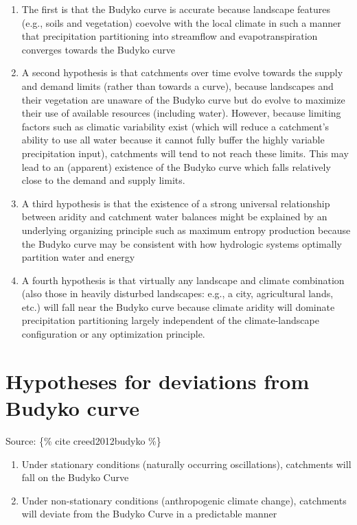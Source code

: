 \documentclass[
  letterpaper,
  DIV=11,
  numbers=noendperiod]{scrreprt}
\providecommand{\tightlist}{%
  \setlength{\itemsep}{0pt}\setlength{\parskip}{0pt}}\usepackage{longtable,booktabs,array}
\begin{document}
\begin{enumerate}
\def\labelenumi{\arabic{enumi}.}
\tightlist
\item
  The first is that the Budyko curve is accurate because landscape
  features (e.g., soils and vegetation) coevolve with the local climate
  in such a manner that precipitation partitioning into streamflow and
  evapotranspiration converges towards the Budyko curve
\item
  A second hypothesis is that catchments over time evolve towards the
  supply and demand limits (rather than towards a curve), because
  landscapes and their vegetation are unaware of the Budyko curve but do
  evolve to maximize their use of available resources (including water).
  However, because limiting factors such as climatic variability exist
  (which will reduce a catchment's ability to use all water because it
  cannot fully buffer the highly variable precipitation input),
  catchments will tend to not reach these limits. This may lead to an
  (apparent) existence of the Budyko curve which falls relatively close
  to the demand and supply limits.
\item
  A third hypothesis is that the existence of a strong universal
  relationship between aridity and catchment water balances might be
  explained by an underlying organizing principle such as maximum
  entropy production because the Budyko curve may be consistent with how
  hydrologic systems optimally partition water and energy
\item
  A fourth hypothesis is that virtually any landscape and climate
  combination (also those in heavily disturbed landscapes: e.g., a city,
  agricultural lands, etc.) will fall near the Budyko curve because
  climate aridity will dominate precipitation partitioning largely
  independent of the climate-landscape configuration or any optimization
  principle.
\end{enumerate}

\hypertarget{hypotheses-for-deviations-from-budyko-curve}{%
\section{Hypotheses for deviations from Budyko
curve}\label{hypotheses-for-deviations-from-budyko-curve}}

Source: \{\% cite creed2012budyko \%\}

\begin{enumerate}
\def\labelenumi{\arabic{enumi}.}
\tightlist
\item
  Under stationary conditions (naturally occurring oscillations),
  catchments will fall on the Budyko Curve
\item
  Under non-stationary conditions (anthropogenic climate change),
  catchments will deviate from the Budyko Curve in a predictable manner
\end{enumerate}
\end{document}
